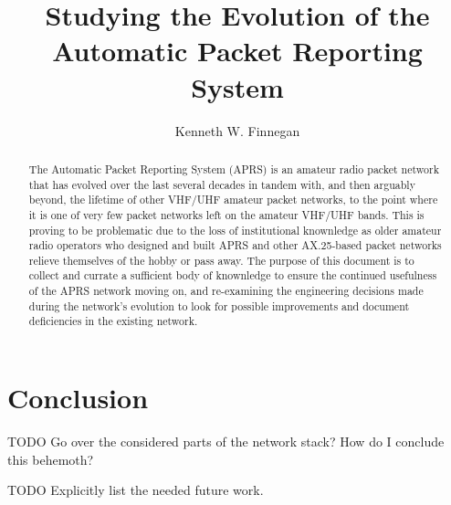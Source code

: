 \documentclass{report}
\begin{document}
\title{Studying the Evolution of the \\
Automatic Packet Reporting System}
\author{Kenneth W. Finnegan}
\maketitle

\begin{abstract}
The Automatic Packet Reporting System (APRS) is an amateur radio packet 
network that has evolved over the last several decades in tandem with, 
and then arguably beyond, the lifetime of other VHF/UHF amateur packet
networks, to the point where it is one of very few packet networks left
on the amateur VHF/UHF bands. This is proving to be problematic due to
the loss of institutional knownledge as older amateur radio operators who
designed and built APRS and other AX.25-based packet networks relieve 
themselves of the hobby or pass away. The purpose of this document is to 
collect and currate a sufficient body of knownledge to ensure the 
continued usefulness of the APRS network moving on, and re-examining 
the engineering decisions made during the network's evolution to look for
possible improvements and document deficiencies in the existing network.
\end{abstract}

\tableofcontents






\chapter{Conclusion}

TODO Go over the considered parts of the network stack? How do I conclude this
behemoth?

TODO Explicitly list the needed future work.

\begin{appendices}


\end{appendices}


\end{document}
